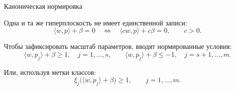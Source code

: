 \SPBGContentSlide
  {Каноническая нормировка}
  {%
    \SmallBody
    Одна и та же гиперплоскость не имеет единственной записи:
    \[
      \langle w,p\rangle+\beta=0
      \quad\Longleftrightarrow\quad
      \langle cw,p\rangle+c\beta=0,\qquad c>0.
    \]

    Чтобы зафиксировать масштаб параметров, вводят нормированные условия:
    \[
      \langle w,p_j\rangle+\beta\geq1,\quad j=1,\ldots,s,
      \qquad
      \langle w,p_j\rangle+\beta\leq-1,\quad j=s+1,\ldots,m.
    \]

    Или, используя метки классов:
    \[
      \xi_j\bigl(\langle w,p_j\rangle+\beta\bigr)\geq1,
      \qquad j=1,\ldots,m.
    \]
  }